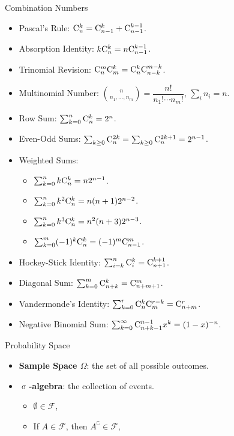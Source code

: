 \documentclass[landscape,a4paper]{article}
\begin{document}
\raggedright
	
	\begin{cheatsheetcolumns}
		\begin{card}{Combination Numbers}
			\begin{itemize}
				\item Pascal's Rule: $\mathrm{C}_{n}^{k}=\mathrm{C}_{n-1}^{k}+\mathrm{C}_{n-1}^{k-1}$.
				\item Absorption Identity: $k\mathrm{C}_{n}^{k}=n\mathrm{C}_{n-1}^{k-1}$.
				\item Trinomial Revision: $\mathrm{C}_{n}^{m}\mathrm{C}_{m}^{k}=\mathrm{C}_{n}^{k}\mathrm{C}_{n-k}^{m-k}$.
				\item Multinomial Number: $\binom{n}{n_1,\dots,n_m}=\dfrac{n!}{n_1!\cdots n_m!}$, $\sum_i n_i=n$.
				\item Row Sum: $\sum_{k=0}^{n}\mathrm{C}_{n}^{k}=2^n$.
				\item Even-Odd Sums: $\sum_{k\ge 0} \mathrm{C}_{n}^{2k}=\sum_{k\ge 0}\mathrm{C}_{n}^{2k+1}=2^{n-1}$.
				\item Weighted Sums:
				\begin{itemize} 
					\item $\sum_{k=0}^{n}k\mathrm{C}_{n}^{k}=n2^{n-1}$.
				\item $\sum_{k=0}^{n}k^2\mathrm{C}_{n}^{k}=n(n+1)2^{n-2}$.
				\item  $\sum_{k=0}^{n}k^3\mathrm{C}_{n}^{k}=n^2(n+3)2^{n-3}$.
				\item  $\sum_{k=0}^m(-1)^k\mathrm{C}_{n}^{k}=(-1)^m\mathrm{C}_{n-1}^{m}$.
				\end{itemize}
				\item Hockey-Stick Identity: $\sum_{i=k}^n\mathrm{C}_{i}^{k}=\mathrm{C}_{n+1}^{k+1}$.
				\item Diagonal Sum: $\sum_{k=0}^m \mathrm{C}_{n+k}^{k}=\mathrm{C}_{n+m+1}^{m}$.
				\item Vandermonde's Identity: $\sum_{k=0}^r \mathrm{C}_{n}^{k}\mathrm{C}_{m}^{r-k}=\mathrm{C}_{n+m}^{r}$.
				\item Negative Binomial Sum: $\sum_{k=0}^\infty \mathrm{C}_{n+k-1}^{n-1}x^k=(1-x)^{-n}$.
			\end{itemize}
		\end{card}
		\begin{card}{Probability Space}
			\begin{itemize}
				\item \textbf{Sample Space $\Omega$}: the set of all possible outcomes.
				\item \textbf{$\upsigma$-algebra}: the collection of events.
				\begin{itemize}
					\item $\emptyset\in\mathcal F$,
					\item If $A\in\mathcal F$, then $A^\complement\in \mathcal F$,

\end{itemize}
\end{itemize}
\end{card}
\end{cheatsheetcolumns}
\end{document}
